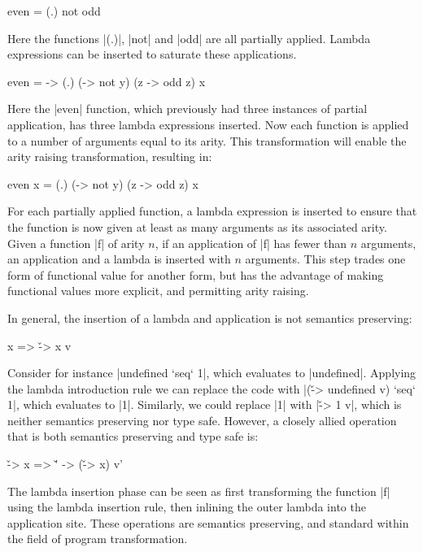 \documentclass[preprint]{sigplanconf}
\begin{document}
\begin{example}
\begin{code}
even = (.) not odd
\end{code}

Here the functions |(.)|, |not| and |odd| are all partially applied. Lambda expressions can be inserted to saturate these applications.

\begin{code}
even = \x -> (.) (\y -> not y) (z -> odd z) x
\end{code}

Here the |even| function, which previously had three instances of partial application, has three lambda expressions inserted. Now each function is applied to a number of arguments equal to its arity. This transformation will enable the arity raising transformation, resulting in:

\begin{code}
even x = (.) (\y -> not y) (z -> odd z) x
\end{code}
\end{example}

For each partially applied function, a lambda expression is inserted to ensure that the function is now given at least as many arguments as its associated arity. Given a function |f| of arity $n$, if an application of |f| has fewer than $n$ arguments, an application and a lambda is inserted with $n$ arguments. This step trades one form of functional value for another form, but has the advantage of making functional values more explicit, and permitting arity raising.

In general, the insertion of a lambda and application is not semantics preserving:

\begin{code}
x => \v -> x v
\end{code}

Consider for instance |undefined `seq` 1|, which evaluates to |undefined|. Applying the lambda introduction rule we can replace the code with |(\v -> undefined v) `seq` 1|, which evaluates to |1|. Similarly, we could replace |1| with |\v -> 1 v|, which is neither semantics preserving nor type safe. However, a closely allied operation that is both semantics preserving and type safe is:

\begin{code}
\v -> x => \v' -> (\v -> x) v'
\end{code}

The lambda insertion phase can be seen as first transforming the function |f| using the lambda insertion rule, then inlining the outer lambda into the application site. These operations are semantics preserving, and standard within the field of program transformation.
\end{document}
